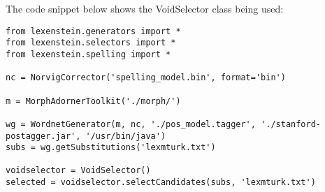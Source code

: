 The code snippet below shows the VoidSelector class being used:

\begin{lstlisting}
from lexenstein.generators import *
from lexenstein.selectors import *
from lexenstein.spelling import *

nc = NorvigCorrector('spelling_model.bin', format='bin')

m = MorphAdornerToolkit('./morph/')

wg = WordnetGenerator(m, nc, './pos_model.tagger', './stanford-postagger.jar', '/usr/bin/java')
subs = wg.getSubstitutions('lexmturk.txt')

voidselector = VoidSelector()
selected = voidselector.selectCandidates(subs, 'lexmturk.txt')
\end{lstlisting}